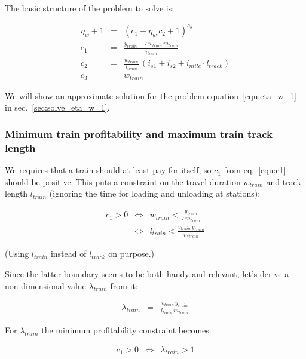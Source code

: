 \documentclass[12pt]{article}
\begin{document}
The basic structure of the problem to solve is:

\begin{eqnarray}
\eta_w + 1  
  &=& 
    \left( 
      c_1 - \eta_w \, c_2 + 1 
    \right) ^{c_3} \label{equ:eta_w_1} \\
c_1 &=& \frac{y_\mathit{train} - 7 \, w_\mathit{train} \, m_\mathit{train}}{i_\mathit{train}} \label{equ:c1} \\
c_2 &=& \frac{w_\mathit{train}}{i_\mathit{train}} \, \left( 
          i_\mathit{s1} + i_\mathit{s2} 
          + i_\mathit{mile} \cdot l_\mathit{track}
        \right) \\
c_3 &=& w_\mathit{train}
\end{eqnarray}

We will show an approximate solution for the problem equation~\ref{equ:eta_w_1} in sec.~\ref{sec:solve_eta_w_1}.

\subsubsection{Minimum train profitability and maximum train track length}

We requires that a train should at least pay for itself, so $c_1$ from eq.~\ref{equ:c1} should be positive. This puts a constraint on the travel duration $w_\mathit{train}$ and track length $l_\mathit{train}$ (ignoring the time for loading and unloading at stations):

\begin{eqnarray}
  c_1 > 0 
& \Longleftrightarrow &
  w_\mathit{train} < \frac{y_\mathit{train}}{7 \, m_\mathit{train}} \\
& \Longleftrightarrow &
  l_\mathit{train} < \frac{v_\mathit{train} \, y_\mathit{train}}{m_\mathit{train}}
\end{eqnarray}

(Using $l_\mathit{train}$ instead of $l_\mathit{track}$ on purpose.)

Since the latter boundary seems to be both handy and relevant, let's derive a non-dimensional value $\lambda_\mathit{train}$ from it:

\begin{eqnarray}
  \lambda_\mathit{train} &=& \frac{v_\mathit{train} \, y_\mathit{train}}{l_\mathit{train} \, m_\mathit{train} }
\end{eqnarray}

For $\lambda_\mathit{train}$ the minimum profitability constraint becomes:

\begin{eqnarray}
  c_1 > 0 & \Longleftrightarrow & \lambda_\mathit{train} > 1  
\end{eqnarray}
\end{document}
